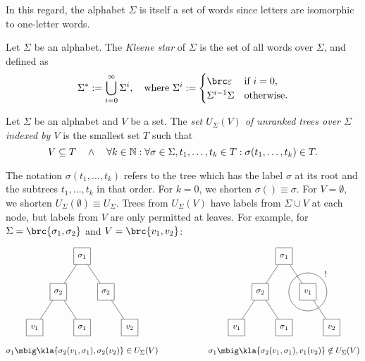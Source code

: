 In this regard, the alphabet $\Sigma$ is itself a set of words since letters
are isomorphic to one-letter words.

\begin{definition}
 Let $\Sigma$ be an alphabet. The \emph{Kleene star} of $\Sigma$ is the set of
 all words over $\Sigma$, and defined as
 \[
  \Sigma^* := \bigcup_{i=0}^\infty \Sigma^i, \quad
  \text{where }\Sigma^i := \begin{cases}
   \brc\eps & \text{if } i = 0, \\
   \Sigma^{i-1}\Sigma & \text{otherwise}.
  \end{cases}
 \]
\end{definition}

\begin{definition}
 Let $\Sigma$ be an alphabet and $V$ be a set. The \emph{set $U_\Sigma(V)$ of
 unranked trees over $\Sigma$ indexed by $V$} is the smallest set $T$ such that
 \[
  V \subseteq T \quad\wedge\quad \forall k\in\mathbb N: \forall \sigma\in\Sigma, t_1,\ldots,t_k\in T: \sigma(t_1,\ldots,t_k)\in T.
 \]
\end{definition}

The notation $\sigma(t_1,\ldots,t_k)$ refers to the tree which has the label
$\sigma$ at its root and the subtrees $t_1,\ldots,t_k$ in that order. For
$k=0$, we shorten $\sigma() \equiv \sigma$. For $V=\emptyset$, we shorten
$U_\Sigma(\emptyset) \equiv U_\Sigma$. Trees from $U_\Sigma(V)$ have labels
from $\Sigma\cup V$ at each node, but labels from $V$ are only permitted at
leaves. For example, for $\Sigma = \brc{\sigma_1,\sigma_2}$ and
$V=\brc{v_1,v_2}$:

\[\begin{matrix}
 \begin{tikzpicture}[every node/.style={rectangle,draw,minimum size=2em},baseline=(current bounding box.center)]
  \node (n)   at (+0,+0.0) { $\sigma_1$ };
  \node (n1)  at (-1,-1.5) { $\sigma_2$ } edge (n);
  \node (n2)  at (+1,-1.5) { $\sigma_2$ } edge (n);
  \node (n11) at (-2,-3.0) { $v_1$ } edge (n1);
  \node (n12) at (+0,-3.0) { $\sigma_1$ } edge (n1);
  \node (n21) at (+2,-3.0) { $v_2$ } edge (n2);
 \end{tikzpicture}
 &\hspace*{4em}&
 \begin{tikzpicture}[every node/.style={rectangle,draw,minimum size=2em},baseline=(current bounding box.center)]
  \node (n)   at (+0,+0.0) { $\sigma_1$ };
  \node (n1)  at (-1,-1.5) { $\sigma_2$ } edge (n);
  \node (n2)  at (+1,-1.5) { $v_1$ } edge (n);
  \node (n11) at (-2,-3.0) { $v_1$ } edge (n1);
  \node (n12) at (+0,-3.0) { $\sigma_1$ } edge (n1);
  \node (n21) at (+2,-3.0) { $v_2$ } edge (n2);
  \draw (n2) circle (0.8);
  \node[draw=none] at (+1.75,-0.75) {!};
 \end{tikzpicture}
 \\\\
 \sigma_1\mbig\kla{\sigma_2(v_1,\sigma_1), \sigma_2(v_2)} \in U_\Sigma(V) &&
 \sigma_1\mbig\kla{\sigma_2(v_1,\sigma_1), v_1(v_2)} \notin U_\Sigma(V)
\end{matrix}\]

